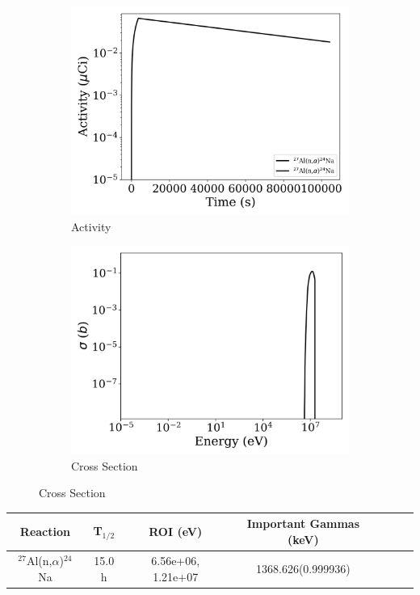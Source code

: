 \begin{figure}[h]
\centering
\begin{subfigure}{.5\textwidth}
  \centering
     \includegraphics[width=.8\textwidth]{plot/Al-27(n,alpha)Na-24_wisconsin1} 

  \caption{Activity}
\end{subfigure}%
\begin{subfigure}{.5\textwidth}
  \centering
     \includegraphics[width=.8\textwidth]{plot/Al-27(n,alpha)Na-24} 

  \caption{Cross Section}
\end{subfigure}
\end{figure}

\begin{table}[h]
\centering
\begin{tabular}{ |c|c|c|c|c|c|c| }
 \hline
 Reaction & T$_{1/2}$ & ROI (eV) & Important Gammas (keV) \\
 \hline 
 $^{27}$Al(n,$\alpha$)$^{24}$Na & 15.0 h & 6.56e+06, 1.21e+07 & 1368.626(0.999936) \\ 
\hline
\end{tabular}
\end{table}
